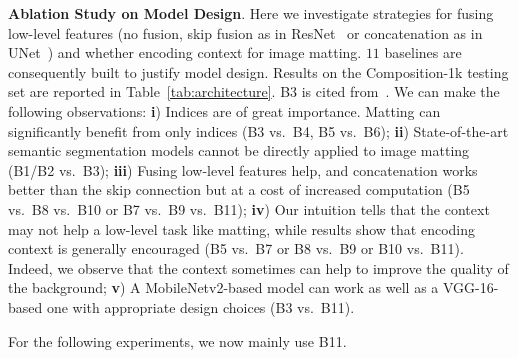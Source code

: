 \documentclass[10pt,twocolumn,letterpaper]{article}
\begin{document}
\vspace{3pt}
\noindent\textbf{Ablation Study on Model Design}. Here we investigate strategies for fusing low-level features (no fusion, skip fusion as in ResNet~\cite{he2016deep} or concatenation as in UNet~\cite{ronneberger2015u}) and whether encoding context for image matting. $11$ baselines are consequently built to justify model design. Results on the Composition-1k testing set are reported in Table~\ref{tab:architecture}. B3 is cited from~\cite{xu2017deep}. We can make the following observations: \textbf{i}) Indices are of great importance. Matting can significantly benefit from only indices (B3 vs.\ B4, B5 vs.\ B6); \textbf{ii}) State-of-the-art semantic segmentation models cannot be directly applied to image matting (B1/B2 vs.\  B3); \textbf{iii}) Fusing low-level features help, and concatenation works better than the skip connection but at a cost of increased computation (B5 vs.\ B8 vs.\ B10 or B7 vs.\ B9 vs.\ B11); \textbf{iv}) Our intuition tells that the context may not help a low-level task like matting, while results show that encoding context is generally encouraged (B5 vs.\  B7 or B8 vs.\ B9 or B10 vs.\  B11). Indeed, we observe that the context sometimes can help to improve the quality of the background; \textbf{v}) A MobileNetv2-based model can work as well as a VGG-16-based one with appropriate design choices (B3 vs.\ B11).

For the following experiments, we now mainly use B11.
\end{document}
